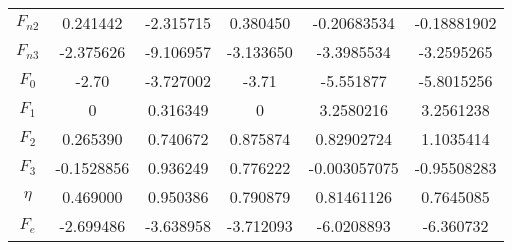 \documentclass[prb,preprint]{revtex4-2}
\begin{document}
\begin{table}
{\begin{tabular}{cccccc}
$F_{n2}$     & 0.241442   & -2.315715  & 0.380450   & -0.20683534   & -0.18881902 \\
$F_{n3}$     & -2.375626  & -9.106957  & -3.133650  & -3.3985534  & -3.2595265  \\
$F_{0}$      & -2.70      & -3.727002  & -3.71      & -5.551877  & -5.8015256  \\
$F_{1}$      & 0          & 0.316349   & 0          & 3.2580216   & 3.2561238   \\
$F_{2}$      & 0.265390   & 0.740672   & 0.875874   & 0.82902724   & 1.1035414   \\
$F_{3}$      & -0.1528856 & 0.936249   & 0.776222   & -0.003057075   & -0.95508283   \\
$\eta$       & 0.469000   & 0.950386   & 0.790879   & 0.81461126   & 0.7645085   \\
$F_{e}$      & -2.699486  & -3.638958  & -3.712093  & -6.0208893  & -6.360732  \\
\bottomrule
\end{tabular}
}
\label{tab:elementary_Ni_Mo_eam}
\end{table}

% 
%
\begin{table}
\caption{
Model parameters of the $\mu(r)$ and $\omega(r)$ functions of the elementary Mo 
ML-ADP.
}
\label{tab:elementary_Mo_adp}
\end{table}

% 
%
\end{document}
